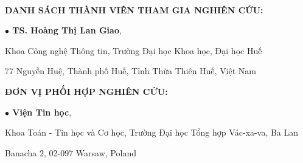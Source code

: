 \newpage
\thispagestyle{empty}
~

\fontsize{13.5}{17}\selectfont
\textbf{DANH SÁCH THÀNH VIÊN THAM GIA NGHIÊN CỨU:}

\textbf{$\bullet$ TS. Hoàng Thị Lan Giao}, 
\vspace{-1.0ex}

Khoa Công nghệ Thông tin, Trường Đại học Khoa học, Đại học Huế
\vspace{-1.0ex}

77 Nguyễn Huệ, Thành phố Huế, Tỉnh Thừa Thiên Huế, Việt Nam

\vspace{3.0ex}
\textbf{ĐƠN VỊ PHỐI HỢP NGHIÊN CỨU:}

\textbf{$\bullet$ Viện Tin học},
\vspace{-1.0ex}

Khoa Toán - Tin học và  Cơ học, Trường Đại học Tổng hợp Vác-xa-va, Ba Lan

\vspace{-1.0ex}
Banacha 2, 02-097 Warsaw, Poland
\cleardoublepage

%

